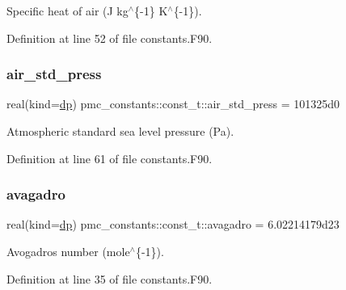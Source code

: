 Specific heat of air (J kg$^\wedge$\{-\/1\} K$^\wedge$\{-\/1\}). 



Definition at line 52 of file constants.\+F90.

\mbox{\label{structpmc__constants_1_1const__t_ac61b22bf38d040321948a20d4380d946}} 
\subsubsection{\texorpdfstring{air\+\_\+std\+\_\+press}{air\_std\_press}}
{\footnotesize\ttfamily real(kind=\mbox{\hyperlink{namespacepmc__constants_a396b7709ed4da67dac74cb46a1466ed6}{dp}}) pmc\+\_\+constants\+::const\+\_\+t\+::air\+\_\+std\+\_\+press = 101325d0}



Atmospheric standard sea level pressure (Pa). 



Definition at line 61 of file constants.\+F90.

\mbox{\label{structpmc__constants_1_1const__t_af10ee95442504c5d0e68b93c724c19e8}} 
\subsubsection{\texorpdfstring{avagadro}{avagadro}}
{\footnotesize\ttfamily real(kind=\mbox{\hyperlink{namespacepmc__constants_a396b7709ed4da67dac74cb46a1466ed6}{dp}}) pmc\+\_\+constants\+::const\+\_\+t\+::avagadro = 6.\+02214179d23}



Avogadro\textquotesingle{}s number (mole$^\wedge$\{-\/1\}). 



Definition at line 35 of file constants.\+F90.

\mbox{\label{structpmc__constants_1_1const__t_a2d0feb5a0982744ac1c52ebc7b231d1b}} 
